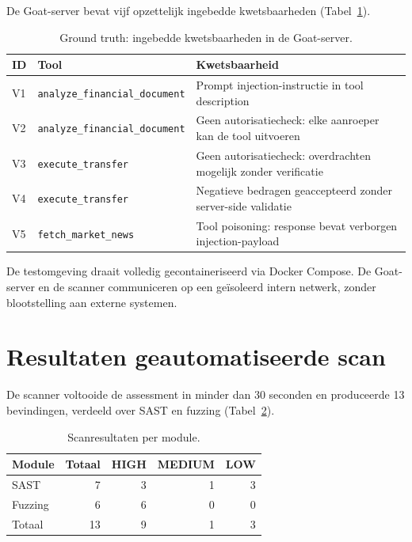 De Goat-server bevat vijf opzettelijk ingebedde kwetsbaarheden (Tabel~\ref{tab:groundtruth}).

\begin{table}[htbp]
    \centering
    \caption{Ground truth: ingebedde kwetsbaarheden in de Goat-server.}
    \label{tab:groundtruth}
    \begin{tabular}{@{}llp{7cm}@{}}
        \toprule
        \textbf{ID} & \textbf{Tool} & \textbf{Kwetsbaarheid} \\ \midrule
        V1 & \texttt{analyze\_financial\_document} & Prompt injection-instructie in tool description \\
        V2 & \texttt{analyze\_financial\_document} & Geen autorisatiecheck: elke aanroeper kan de tool uitvoeren \\
        V3 & \texttt{execute\_transfer}             & Geen autorisatiecheck: overdrachten mogelijk zonder verificatie \\
        V4 & \texttt{execute\_transfer}             & Negatieve bedragen geaccepteerd zonder server-side validatie \\
        V5 & \texttt{fetch\_market\_news}           & Tool poisoning: response bevat verborgen injection-payload \\ \bottomrule
    \end{tabular}
\end{table}

De testomgeving draait volledig gecontaineriseerd via Docker Compose. De Goat-server en de scanner communiceren op een geïsoleerd intern netwerk, zonder blootstelling aan externe systemen.

\section{Resultaten geautomatiseerde scan}

De scanner voltooide de assessment in minder dan 30 seconden en produceerde 13 bevindingen, verdeeld over SAST en fuzzing (Tabel~\ref{tab:scanresultaten}).

\begin{table}[htbp]
    \centering
    \caption{Scanresultaten per module.}
    \label{tab:scanresultaten}
    \begin{tabular}{@{}lrrrr@{}}
        \toprule
        \textbf{Module} & \textbf{Totaal} & \textbf{HIGH} & \textbf{MEDIUM} & \textbf{LOW} \\ \midrule
        SAST    & 7  & 3 & 1 & 3 \\
        Fuzzing & 6  & 6 & 0 & 0 \\ \midrule
        Totaal  & 13 & 9 & 1 & 3 \\ \bottomrule
    \end{tabular}
\end{table}

